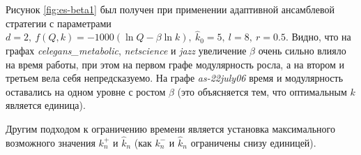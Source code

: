 Рисунок \ref{fig:es-beta1} был получен при применении адаптивной ансамблевой стратегии с параметрами $d = 2,\ f(Q, k) = -1000(\ln Q - \beta \ln k),\ \hat{k}_0 = 5,\ l = 8,\ r = 0.5$. Видно, что на графах \emph{celegans\_metabolic}, \emph{netscience} и \emph{jazz} увеличение $\beta$ очень сильно влияло на время работы, при этом на первом графе модулярность росла, а на втором и третьем вела себя непредсказуемо. На графе \emph{as-22july06} время и модулярность оставались на одном уровне с ростом $\beta$ (это объясняется тем, что оптимальным $k$ является единица).

Другим подходом к ограничению времени является установка максимального возможного значения $k_n^{+}$ и $\hat{k}_n$ (как $k_n^{-}$ и $\hat{k}_n$ ограничены снизу единицей).